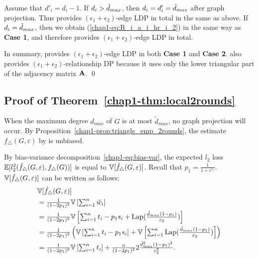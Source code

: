 {Assume that $d'_i = d_i - 1$. 
If $d_i > \tilde{d}_{max}$, then $d_i = d'_i = \tilde{d}_{max}$ after graph projection. 
Thus  provides $(\epsilon_1 + \epsilon_2)$-edge LDP in total in the same as above. 
If $d_i = \tilde{d}_{max}$, then we obtain (\ref{chap1-eq:R_i_a_i_hr_i_2}) in the same way as \textbf{Case 1}, and therefore  provides $(\epsilon_1 + \epsilon_2)$-edge LDP in total.

\smallskip
In summary,  provides $(\epsilon_1 + \epsilon_2)$-edge LDP in both \textbf{Case 1} and \textbf{Case 2}. 
 also provides $(\epsilon_1 + \epsilon_2)$-relationship DP 
because it uses only the lower triangular part of the adjacency matrix $\mathbf{A}$. \qed

\subsection{Proof of Theorem~\ref{chap1-thm:local2rounds}}
  When the maximum degree $d_{max}$ of $G$ is at most $\tilde{d}_{max}$, no graph
  projection will occur.
  By Proposition~\ref{chap1-prop:triangle_emp_2rounds}, the estimate
  $f_\triangle(G,\varepsilon)$ by  is unbiased.

  By bias-variance
  decomposition~\eqref{chap1-eq:bias-var}, the expected $l_2$ loss
  $\mathbb{E}[l_2^2(\hat{f}_\triangle(G, \varepsilon), f_\triangle(G))]$ is equal to
  $\mathbb{V}[\hat{f}_\triangle(G,\varepsilon)]$.
  Recall that $p_1 = \frac{1}{1+e^{\epsilon_1}}$.
  $\mathbb{V}[\hat{f}_\triangle(G,\varepsilon)]$ 
  can be written as follows:
  \begin{align}
    &\mathbb{V}[\hat{f}_\triangle(G,\varepsilon)] \\
    &= \textstyle{\frac{1}{(1-2p_1)^2}\mathbb{V}\left[\sum_{i=1}^n
    \hat{w}_i\right]} \nonumber \\
    &= \textstyle{\frac{1}{(1-2p_1)^2}\mathbb{V}\left[\sum_{i=1}^n
    t_i - p_1 s_i +
    \textrm{Lap}(\frac{\tilde{d}_{max}(1-p_1)}{\varepsilon_2})\right]} \nonumber \\
    &= \textstyle{\frac{1}{(1-2p_1)^2}\left(\mathbb{V}\left[\sum_{i=1}^n
    t_i - p_1 s_i \right] +
    \mathbb{V}\left[\sum_{i=1}^n
    \textrm{Lap}(\frac{\tilde{d}_{max}(1-p_1)}{\varepsilon_2})\right]\right)} \nonumber \\
    &= \textstyle{\frac{1}{(1-2p_1)^2}\mathbb{V}\left[\sum_{i=1}^n
    t_i \right] + \frac{n}{(1-2p_1)^2}
    2\frac{\tilde{d}_{max}^2(1-p_1)^2}{\varepsilon_2^2}}.\label{chap1-eq:local2rounds-var}
  \end{align}

}
